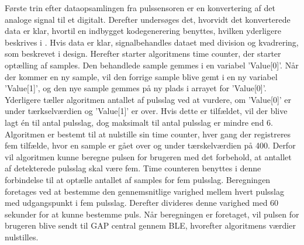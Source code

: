 Første trin efter dataopsamlingen fra pulssensoren er en konvertering af det analoge signal til et digitalt. Derefter undersøges det, hvorvidt det konverterede data er klar, hvortil en indbygget kodegenerering benyttes, hvilken yderligere beskrives i . Hvis data er klar, signalbehandles dataet med division og kvadrering, som beskrevet i design. Herefter starter algoritmens time counter, der starter optælling af samples. Den behandlede sample gemmes i en variabel 'Value[0]'. Når der kommer en ny sample, vil den forrige sample blive gemt i en ny variabel 'Value[1]', og den nye sample gemmes på ny plads i arrayet for 'Value[0]'. Yderligere tæller algoritmen antallet af pulsslag ved at vurdere, om 'Value[0]' er under tærkselværdien og 'Value[1]' er over. Hvis dette er tilfældet, vil der blive lagt én til antal pulsslag, dog maksimalt til antal pulsslag er mindre end 6. Algoritmen er bestemt til at nulstille sin time counter, hver gang der registreres fem tilfælde, hvor en sample er gået over og under tærskelværdien på 400. Derfor vil algoritmen kunne beregne pulsen for brugeren med det forbehold, at antallet af detekterede pulsslag skal være fem. Time counteren benyttes i denne forbindelse til at optælle antallet af samples for fem pulsslag. Beregningen foretages ved at bestemme den gennemsnitlige varighed mellem hvert pulsslag med udgangspunkt i fem pulsslag. Derefter divideres denne varighed med 60 sekunder for at kunne bestemme puls. Når beregningen er foretaget, vil pulsen for brugeren blive sendt til GAP central gennem BLE, hvorefter algoritmens værdier nulstilles.\\

